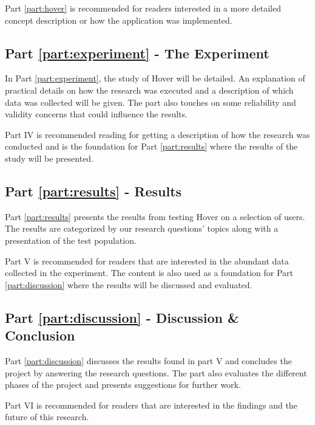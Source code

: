 Part \ref{part:hover} is recommended for readers interested in a more detailed concept description or how the application was implemented.

\subsection*{Part \ref{part:experiment} - The Experiment}
In Part \ref{part:experiment}, the study of Hover will be detailed. An explanation of practical details on how the research was executed and a description of which data was collected will be given. The part also touches on some reliability and validity concerns that could influence the results.

Part IV is recommended reading for getting a description of how the research was conducted and is the foundation for Part \ref{part:results} where the results of the study will be presented.

\subsection*{Part \ref{part:results} - Results}
Part \ref{part:results} presents the results from testing Hover on a selection of users. The results are categorized by our research questions’ topics along with a presentation of the test population.

Part V is recommended for readers that are interested in the abundant data collected in the experiment. The content is also used as a foundation for Part \ref{part:discussion} where the results will be discussed and evaluated.

\subsection*{Part \ref{part:discussion} - Discussion \& Conclusion}
Part \ref{part:discussion} discusses the results found in part V and concludes the project by answering the research questions. The part also evaluates the different phases of the project and presents suggestions for further work. 

Part VI is recommended for readers that are interested in the findings and the future of this research.
